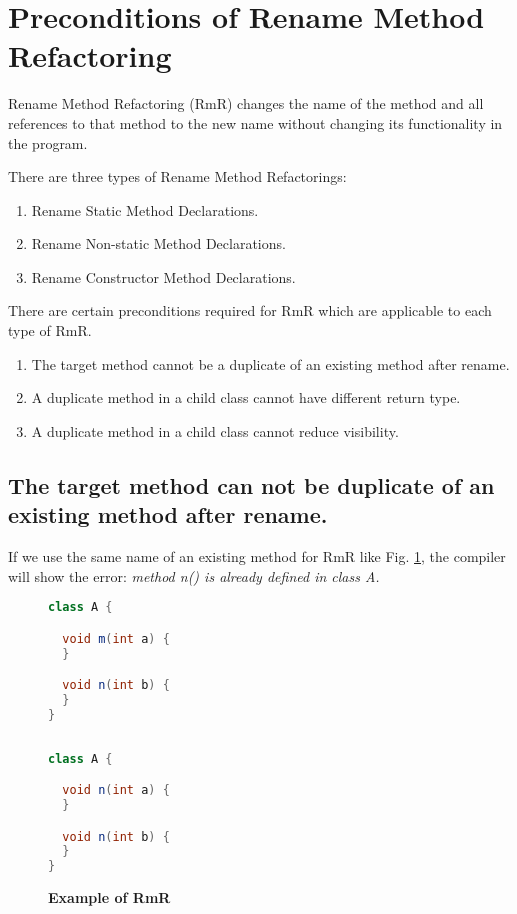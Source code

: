 \section{\textbf{Preconditions of Rename Method Refactoring}}

Rename Method Refactoring (RmR) changes the name of the method and all references to that method to the new name without changing its functionality in the program.

There are three types of Rename Method Refactorings:
\begin{enumerate}
\item Rename Static Method Declarations.
\item Rename Non-static Method Declarations.
\item Rename Constructor Method Declarations.
\end{enumerate}

There are certain preconditions required for RmR which are applicable to each type of RmR.
\begin{enumerate}
	\item The target method cannot be a duplicate of an existing method after rename.
	\item A duplicate method in a child class cannot have different return type.
	\item A duplicate method in a child class cannot reduce visibility.
\end{enumerate}

\subsection {The target method can not be duplicate of an existing method after rename. }

If we use the same name of an existing method for RmR like Fig. \ref{fig:RmR}, the compiler will show the error: \textsl{method n() is already defined in class A.}

\begin{figure}[th]
\centering
\begin{minipage}[t]{0.45\linewidth}
\begin{lstlisting}[language=java, basicstyle=\scriptsize\ttfamily,frame=single]
class A {

  void m(int a) {	
  }

  void n(int b) {	
  }	
}
 
\end{lstlisting}
\end{minipage}
\hfill
\begin{minipage}[t]{0.45\linewidth}
\begin{lstlisting}[language=java, basicstyle=\scriptsize\ttfamily,frame=single]
class A {

  void n(int a) {	
  }

  void n(int b) {	
  }	
}

\end{lstlisting}
\end{minipage}
\caption{\textbf{Example of RmR}}
\label{fig:RmR}
\end{figure}

